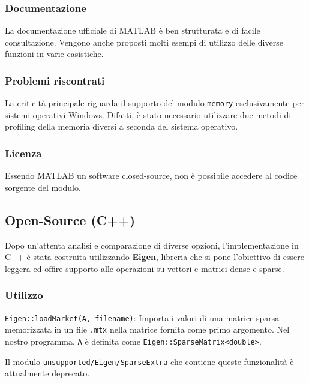 \documentclass[11pt,italian]{article}
\begin{document}
\subsubsection{Documentazione}
La documentazione ufficiale di MATLAB è ben strutturata e di facile consultazione. Vengono anche proposti molti esempi di utilizzo delle diverse funzioni in varie casistiche.

\subsubsection{Problemi riscontrati}
La criticità principale riguarda il supporto del modulo \lstinline{memory} esclusivamente per sistemi operativi Windows. Difatti, è stato necessario utilizzare due metodi di profiling della memoria diversi a seconda del sistema operativo.

\subsubsection*{Licenza}
Essendo MATLAB un software closed-source, non è possibile accedere al codice sorgente del modulo.

\subsection{Open-Source (C++)}
Dopo un'attenta analisi e comparazione di diverse opzioni, l'implementazione in C++ è stata costruita utilizzando \textbf{Eigen},  libreria che si pone l'obiettivo di essere leggera ed offire supporto alle operazioni su vettori e matrici dense e sparse.

\subsubsection*{Utilizzo}
\lstinline{Eigen::loadMarket(A, filename)}: Importa i valori di una matrice sparsa memorizzata in un file \lstinline{.mtx} nella matrice fornita come primo argomento. Nel nostro programma, \lstinline{A} è definita come \lstinline{Eigen::SparseMatrix<double>}.

Il modulo \lstinline{unsupported/Eigen/SparseExtra} che contiene queste funzionalità è attualmente deprecato.

\end{document}

